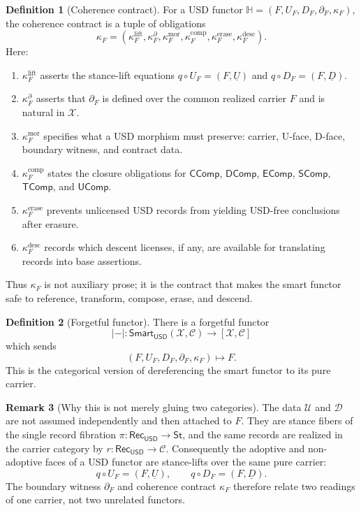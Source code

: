 \documentclass[11pt]{article}
\newcommand{\USD}{\mathsf{USD}}
\newcommand{\RecUSD}{\mathsf{Rec}_{\USD}}
\newcommand{\St}{\mathsf{St}}
\newcommand{\UFib}{\mathcal U}
\newcommand{\DFib}{\mathcal D}
\newcommand{\Smart}{\mathsf{Smart}}
\newcommand{\CComp}{\mathsf{CComp}}
\newcommand{\DComp}{\mathsf{DComp}}
\newcommand{\EComp}{\mathsf{EComp}}
\newcommand{\SComp}{\mathsf{SComp}}
\newcommand{\TComp}{\mathsf{TComp}}
\newcommand{\UComp}{\mathsf{UComp}}
\theoremstyle{definition}
\newtheorem{definition}{Definition}[section]
\newtheorem{remark}[definition]{Remark}
\theoremstyle{plain}
\begin{document}
\begin{definition}[Coherence contract]
For a USD functor $\mathbb H=(F,U_F,D_F,\partial_F,\kappa_F)$, the
coherence contract is a tuple of obligations
\[
  \kappa_F=(\kappa_F^{\mathrm{lift}},
            \kappa_F^{\partial},
            \kappa_F^{\mathrm{mor}},
            \kappa_F^{\mathrm{comp}},
            \kappa_F^{\mathrm{erase}},
            \kappa_F^{\mathrm{desc}}).
\]
Here:
\begin{enumerate}[label=(\roman*),leftmargin=*]
  \item $\kappa_F^{\mathrm{lift}}$ asserts the stance-lift equations
  $q\circ U_F=(F,\underline U)$ and $q\circ D_F=(F,\underline D)$.
  \item $\kappa_F^{\partial}$ asserts that $\partial_F$ is defined over
  the common realized carrier $F$ and is natural in $\mathcal X$.
  \item $\kappa_F^{\mathrm{mor}}$ specifies what a USD morphism must
  preserve: carrier, U-face, D-face, boundary witness, and contract data.
  \item $\kappa_F^{\mathrm{comp}}$ states the closure obligations for
  $\CComp$, $\DComp$, $\EComp$, $\SComp$, $\TComp$, and $\UComp$.
  \item $\kappa_F^{\mathrm{erase}}$ prevents unlicensed USD records from
  yielding USD-free conclusions after erasure.
  \item $\kappa_F^{\mathrm{desc}}$ records which descent licenses, if any,
  are available for translating records into base assertions.
\end{enumerate}
Thus $\kappa_F$ is not auxiliary prose; it is the contract that makes the
smart functor safe to reference, transform, compose, erase, and descend.
\end{definition}

\begin{definition}[Forgetful functor]
There is a forgetful functor
\[
  |-|:\Smart_{\USD}(\mathcal X,\mathcal C)\to [\mathcal X,\mathcal C]
\]
which sends
\[
  (F,U_F,D_F,\partial_F,\kappa_F)\mapsto F.
\]
This is the categorical version of dereferencing the smart functor to its
pure carrier.
\end{definition}

\begin{remark}[Why this is not merely gluing two categories]
The data $\UFib$ and $\DFib$ are not assumed independently and then
attached to $F$.  They are stance fibers of the single record fibration
$\pi:\RecUSD\to\St$, and the same records are realized in the carrier
category by $r:\RecUSD\to\mathcal C$.  Consequently the adoptive and
non-adoptive faces of a USD functor are stance-lifts over the same pure
carrier:
\[
  q\circ U_F=(F,\underline U),
  \qquad
  q\circ D_F=(F,\underline D).
\]
The boundary witness $\partial_F$ and coherence contract $\kappa_F$
therefore relate two readings of one carrier, not two unrelated functors.
\end{remark}
\end{document}
